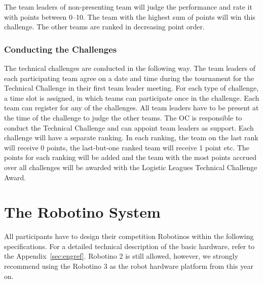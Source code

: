 \documentclass[12pt,twoside]{article}
\begin{document}
The team leaders of non-presenting team will judge the performance and
rate it with points between 0--10.  The team with the highest sum of
points will win this challenge. The other teams are ranked in
decreasing point order.

\subsubsection{Conducting the Challenges~}
The technical challenges are conducted in the following way. The team
leaders of each participating team agree on a date and time during the
tournament for the Technical Challenge in their first team leader
meeting. For each type of challenge, a time slot is assigned, in which
teams can participate once in the challenge. Each team can register
for any of the challenges. All team leaders have to be present at the
time of the challenge to judge the other teams. The OC is responsible
to conduct the Technical Challenge and can appoint team leaders as
support. Each challenge will have a separate ranking. In each ranking,
the team on the last rank will receive 0 points, the last-but-one
ranked team will receive 1 point etc. The points for each ranking will
be added and the team with the most points accrued over all challenges
will be awarded with the Logistic Leagues Technical Challenge Award.


\section{The Robotino System}
\label{sec:robotino}

All participants have to design their competition Robotinos within the
following specifications. For a detailed technical description of the
basic hardware, refer to the Appendix~\ref{sec:engref}. Robotino 2 is
still allowed, however, we strongly recommend using the Robotino 3 as
the robot hardware platform from this year on.
\end{document}
